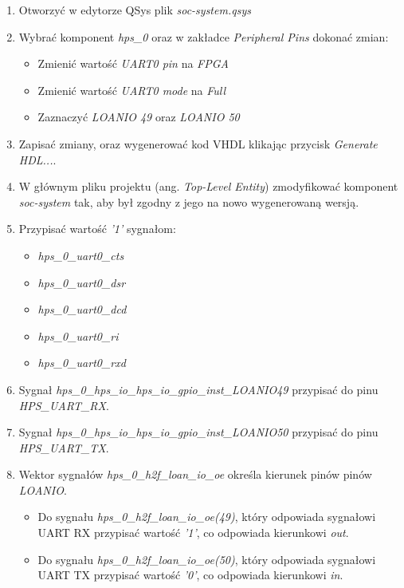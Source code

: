 \begin{enumerate}
\item Otworzyć w edytorze QSys plik \textit{soc-system.qsys}
\item Wybrać komponent \textit{hps\_0} oraz w zakładce \textit{Peripheral Pins} dokonać zmian:
	\begin{itemize}[noitemsep,nolistsep]
	\item Zmienić wartość \textit{UART0 pin} na \textit{FPGA}
	\item Zmienić wartość \textit{UART0 mode} na \textit{Full}
	\item Zaznaczyć \textit{LOANIO 49} oraz \textit{LOANIO 50}
	\end{itemize}
\item Zapisać zmiany, oraz wygenerować kod VHDL klikając przycisk \textit{Generate HDL...}.
\item W głównym pliku projektu (ang. \textit{Top-Level Entity}) zmodyfikować komponent \textit{soc-system} tak, aby był zgodny z jego na nowo wygenerowaną wersją.
\item Przypisać wartość \textit{'1'} sygnałom:
	\begin{itemize}[noitemsep,nolistsep]
	\item \textit{hps\_0\_uart0\_cts}
	\item \textit{hps\_0\_uart0\_dsr}
	\item \textit{hps\_0\_uart0\_dcd}
	\item \textit{hps\_0\_uart0\_ri}
	\item \textit{hps\_0\_uart0\_rxd}
	\end{itemize}
\item Sygnał \textit{hps\_0\_hps\_io\_hps\_io\_gpio\_inst\_LOANIO49} przypisać do pinu \textit{HPS\_UART\_RX}.
\item Sygnał \textit{hps\_0\_hps\_io\_hps\_io\_gpio\_inst\_LOANIO50} przypisać do pinu \textit{HPS\_UART\_TX}.
\item Wektor sygnałów \textit{hps\_0\_h2f\_loan\_io\_oe} określa kierunek pinów pinów \textit{LOANIO}.
	\begin{itemize}[noitemsep,nolistsep]
	\item Do sygnału \textit{hps\_0\_h2f\_loan\_io\_oe(49)}, który odpowiada sygnałowi UART RX przypisać wartość \textit{'1'}, co odpowiada kierunkowi \textit{out}.
	\item Do sygnału \textit{hps\_0\_h2f\_loan\_io\_oe(50)}, który odpowiada sygnałowi UART TX przypisać wartość \textit{'0'}, co odpowiada kierunkowi \textit{in}.
	\end{itemize}
\end{enumerate}

